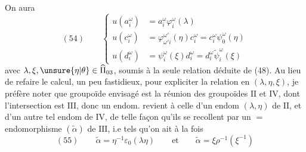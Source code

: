 On aura
\[
(54)\qquad\left\{\begin{aligned}
u(a_i^\omega)&=a_i^\omega\varphi_i^\omega(\lambda)\\
u(c_i^\omega)&=\varphi_{\omega'i}^{\omega'}(\eta)c_i^\omega=c_i^\omega\psi_0^\omega(\eta)\\
u(d_i^\omega)&=\psi_i^\omega(\xi)d_i^\omega=d_i^\omega\widetilde\psi_i^\omega(\xi)
\end{aligned}\right.
\]
avec $\lambda,\xi,\unsure{\eta|\theta}\in\widehat\Pi_{03}$, soumis à la seule relation déduite de (48). Au lieu de refaire le calcul, un peu fastidieux, pour expliciter la relation en $(\lambda,\eta,\xi)$, je préfère noter que  groupoïde envisagé est la réunion des groupoïdes $\mathrm{II}$ et $\mathrm{IV}$, dont l'intersection est $\mathrm{III}$, donc un endom.  revient à celle d'un  endom $(\lambda,\eta)$ de $\mathrm{II}$, et d'un autre tel endom \inserted{$\xi$} de $\mathrm{IV}$, de telle façon qu'ils se recollent  par un $=$ endomorphisme $(\widetilde\alpha)$ de $\mathrm{III}$, i.e tels qu'on ait à la fois
\[
(55)\qquad\widetilde\alpha=\eta^{-1}\varepsilon_0(\lambda\eta)\qquad\text{et}\qquad
\widetilde\alpha=\xi\rho^{-1}(\xi^{-1})
\]

